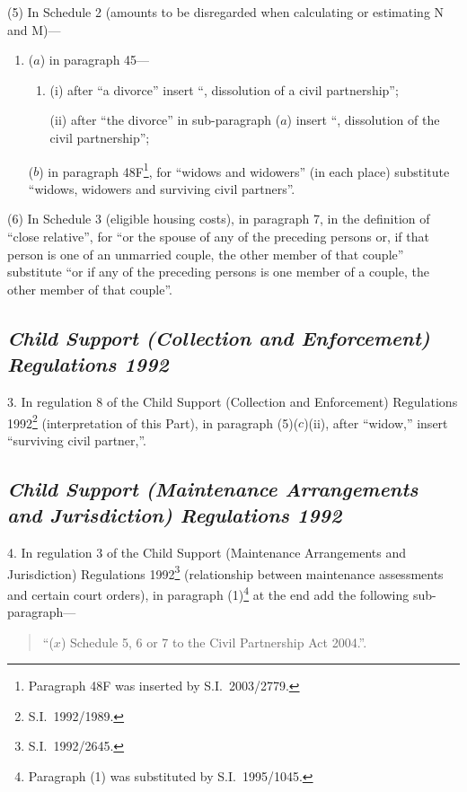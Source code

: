 \documentclass[12pt,a4paper]{article}
\begin{document}
(5) In Schedule 2 (amounts to be disregarded when calculating or estimating N and M)—
\begin{enumerate}\item[]
($a$) in paragraph 45—
\begin{enumerate}\item[]
(i) after “a divorce” insert “, dissolution of a civil partnership”;

(ii) after “the divorce” in sub-paragraph ($a$)  insert “, dissolution of the civil partnership”;
\end{enumerate}

($b$) in paragraph 48F\footnote{Paragraph 48F was inserted by S.I.\ 2003/2779.}, for “widows and widowers” (in each place) substitute “widows, widowers and surviving civil partners”.
\end{enumerate}

(6) In Schedule 3 (eligible housing costs), in paragraph 7, in the definition of “close relative”, for “or the spouse of any of the preceding persons or, if that person is one of an unmarried couple, the other member of that couple” substitute “or if any of the preceding persons is one member of a couple, the other member of that couple”.

\subsection*{\itshape\sloppy Child Support (Collection and Enforcement) Regulations 1992}

3.  In regulation 8 of the Child Support (Collection and Enforcement) Regulations 1992\footnote{S.I.\ 1992/1989.} (interpretation of this Part), in paragraph (5)($c$)(ii), after “widow,” insert “surviving civil partner,”.

\subsection*{\itshape Child Support (Maintenance Arrangements and Jurisdiction) Regulations 1992}

4.  In regulation 3 of the Child Support (Maintenance Arrangements and Jurisdiction) Regulations 1992\footnote{S.I.\ 1992/2645.} (relationship between maintenance assessments and certain court orders), in paragraph (1)\footnote{Paragraph (1) was substituted by S.I.\ 1995/1045.} at the end add the following sub-paragraph—
\begin{quotation}
“($x$) Schedule 5, 6 or 7 to the Civil Partnership Act 2004.”.
\end{quotation}
\end{document}

